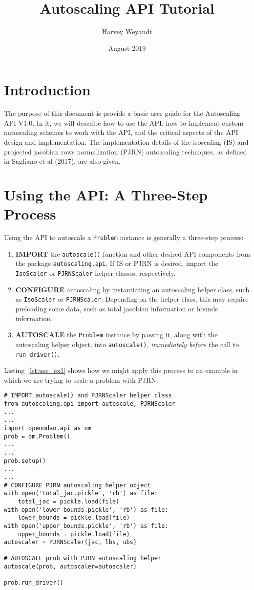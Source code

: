 \documentclass{article}
\title{Autoscaling API Tutorial}
\author{Harvey Weyandt}
\date{August 2019}
\theoremstyle{definition}
\begin{document}
\maketitle
\section*{Introduction}
The purpose of this document is provide a basic user guide for the Autoscaling API V1.0. In it, we will describe how to use the API, how to implement custom autoscaling schemes to work with the API, and the critical aspects of the API design and implementation. The implementation details of the isoscaling (IS) and projected jacobian rows normalization (PJRN) autoscaling techniques, as defined in Sagliano et al (2017), are also given.

\section{Using the API: A Three-Step Process}
Using the API to autoscale a \texttt{Problem} instance is generally a three-step process:
\begin{enumerate}
    \item \textbf{IMPORT} the \texttt{autoscale()} function and other desired API components from the package \verb|autoscaling.api|. If IS or PJRN is desired, import the \texttt{IsoScaler} or \texttt{PJRNScaler} helper classes, respectively.
    \item \textbf{CONFIGURE} autoscaling by instantiating an autoscaling helper class, such as \texttt{IsoScaler} or \texttt{PJRNScaler}. Depending on the helper class, this may require preloading some data, such as total jacobian information or bounds information.
    \item \textbf{AUTOSCALE} the \texttt{Problem} instance by passing it, along with the autoscaling helper object, into \texttt{autoscale()}, \textit{immediately before} the call to \texttt{run\_driver()}.
\end{enumerate}
Listing~\ref{lst:use_ex1} shows how we might apply this process to an example in which we are trying to scale a problem with PJRN.

\begin{lstlisting}[backgroundcolor=\color{mygray}, label={lst:use_ex1}, caption=General example of autoscaling a problem with PJRN]
# IMPORT autoscale() and PJRNScaler helper class
from autoscaling.api import autoscale, PJRNScaler
...
...
import openmdao.api as om
prob = om.Problem()
...
...
prob.setup()
...
...
# CONFIGURE PJRN autoscaling helper object
with open('total_jac.pickle', 'rb') as file:
    total_jac = pickle.load(file)
with open('lower_bounds.pickle', 'rb') as file:
    lower_bounds = pickle.load(file)
with open('upper_bounds.pickle', 'rb') as file:
    upper_bounds = pickle.load(file)
autoscaler = PJRNScaler(jac, lbs, ubs)

# AUTOSCALE prob with PJRN autoscaling helper
autoscale(prob, autoscaler=autoscaler)

prob.run_driver()
\end{lstlisting}
\end{document}
